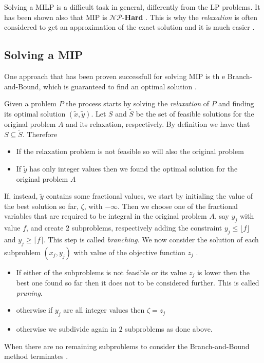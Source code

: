 Solving a \acrshort{MILP} is a difficult task in general, differently from the
\acrshort{LP} problems. It has been shown also that \acrshort{MIP} is
$\mathcal{NP}$-\textbf{Hard}
\cite{Kannan1978}\cite{Liberti2019}\cite{Schrijver1998}. This is why the \emph{relaxation} is often considered
to get an approximation of the exact solution and it is much easier
\cite{Conforti2016}.

\subsection{Solving a MIP}%
\label{sub:solving_a_mip}

One approach that has been proven successfull for solving \acrshort{MIP} is th
e Branch-and-Bound, which is guaranteed to find an optimal solution
\cite{Conforti2016}\cite{Edgar2001}.

Given a problem $P$ the process starts by solving the \emph{relaxation} of $P$
and finding its optimal solution $(\tilde{x}, \tilde{y})$.
Let $S$ and  $\tilde{S}$ be the set of feasible solutions
for the original problem $A$ and its relaxation, respectively. By definition
we have that $S \subseteq \tilde{S} $.
Therefore \cite{Edgar2001}
\begin{itemize}
	\item If the relaxation problem is not feasible so will also the original
	      problem
	\item If $\tilde{y}$ has only integer values then we found the optimal
	      solution for the original problem $A$
\end{itemize}

If, instead, $\tilde{y}$ contains some fractional values, we start by
initialing the value of the best solution so far, $\zeta$, with $-\infty$.
Then we choose one of the fractional variables that are required to be integral
in the original problem $A$, say $y_j$ with value $f$, and create $2$
subproblems, respectively adding the constraint $y_{j} \leq \lfloor f \rfloor$
and $y_{j} \geq \lceil f \rceil$. This step is called \emph{branching}. We now
consider the solution of each subproblem $(x_j, y_j)$ with value of the
objective function $z_{j} $ \cite{Edgar2001}\cite{Conforti2016}.

\begin{itemize}
	\item If either of the subproblems is not feasible or its value $z_{j} $ is
	      lower then the best one found so far then it does not to be
	      considered further. This is called \emph{pruning}.
	\item otherwise if $y_{j} $ are all integer values then $\zeta = z_{j} $
	\item otherwise we subdivide again in $2$ subproblems as done above.
\end{itemize}

When there are no remaining subproblems to consider the Branch-and-Bound method
terminates \cite{Edgar2001}.
